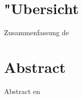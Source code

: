 \cleardoublepage


\chapter{"Ubersicht}

Zusammenfassung de

\chapter{Abstract}
Abstract en

\cleardoublepage

\pagestyle{headings}
\tableofcontents

